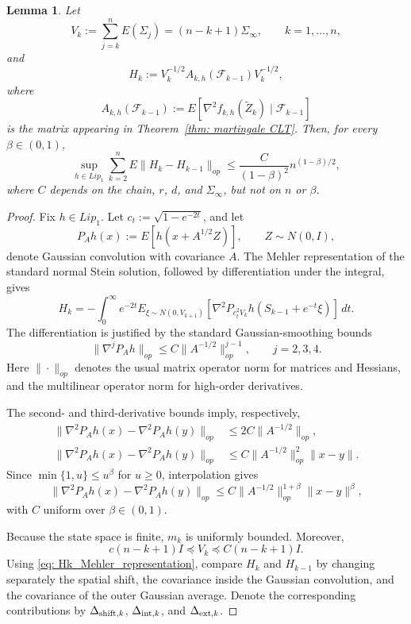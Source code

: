 \documentclass[10pt,a4paper]{article}
\newtheorem{lemma}{Lemma}
\begin{document}
\begin{lemma}
\label{lem: H_variation}
Let
\[
    V_k:=\sum_{j=k}^n E(\Sigma_j)=(n-k+1)\Sigma_\infty,
    \qquad k=1,\ldots,n,
\]
and
\[
    H_k:=V_k^{-1/2}A_{k,h}(\mathcal F_{k-1})V_k^{-1/2},
\]
where
\[
    A_{k,h}(\mathcal F_{k-1})
    :=E[\nabla^2f_{k,h}(\widetilde Z_k)\mid\mathcal F_{k-1}]
\]
is the matrix appearing in Theorem~\ref{thm: martingale CLT}. Then, for every
$\beta\in(0,1)$,
\[
    \sup_{h\in Lip_1}\sum_{k=2}^nE\|H_k-H_{k-1}\|_{op}
    \le \frac{C}{(1-\beta)^2}n^{(1-\beta)/2},
\]
where $C$ depends on the chain, $r$, $d$, and $\Sigma_\infty$, but not on
$n$ or $\beta$.
\end{lemma}

\begin{proof}
Fix $h\in Lip_1$. Let $c_t:=\sqrt{1-e^{-2t}}$, and let
\[
    P_Ah(x):=E[h(x+A^{1/2}Z)],\qquad Z\sim N(0,I),
\]
denote Gaussian convolution with covariance $A$. The Mehler representation
of the standard normal Stein solution, followed by differentiation under the
integral, gives
\begin{equation}\label{eq: Hk_Mehler_representation}
    H_k=-\int_0^\infty e^{-2t}
    E_{\xi\sim N(0,V_{k+1})}
    [\nabla^2P_{c_t^2V_k}h(S_{k-1}+e^{-t}\xi)]\,dt.
\end{equation}
The differentiation is justified by the standard Gaussian-smoothing bounds
\[
    \|\nabla^jP_Ah\|_{op}
    \le C\|A^{-1/2}\|_{op}^{j-1},\qquad j=2,3,4.
\]
Here $\|\cdot\|_{op}$ denotes the usual matrix operator norm for matrices and Hessians, and the multilinear operator norm for high-order derivatives.


The second- and third-derivative bounds imply, respectively,
\[
\begin{split}
\|\nabla^2P_Ah(x)-\nabla^2P_Ah(y)\|_{op}
&\le 2C\|A^{-1/2}\|_{op},\\
\|\nabla^2P_Ah(x)-\nabla^2P_Ah(y)\|_{op}
&\le C\|A^{-1/2}\|_{op}^2\|x-y\|.
\end{split}
\]
Since $\min\{1,u\}\le u^\beta$ for $u\ge0$, interpolation gives
\begin{equation}\label{eq: uniform_fractional_smoothing}
\|\nabla^2P_Ah(x)-\nabla^2P_Ah(y)\|_{op}
\le C\|A^{-1/2}\|_{op}^{1+\beta}\|x-y\|^\beta,
\end{equation}
with $C$ uniform over $\beta\in(0,1)$.

Because the state space is finite, $m_k$ is uniformly bounded. Moreover,
\[
    c(n-k+1)I\preceq V_k\preceq C(n-k+1)I.
\]
Using \eqref{eq: Hk_Mehler_representation}, compare $H_k$ and $H_{k-1}$ by
changing separately the spatial shift, the covariance inside the Gaussian
convolution, and the covariance of the outer Gaussian average. Denote the
corresponding contributions by $\Delta_{{\rm shift},k}$,
$\Delta_{{\rm int},k}$, and $\Delta_{{\rm ext},k}$.


\end{proof}
\end{document}
